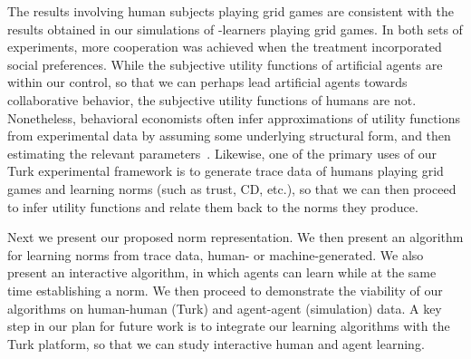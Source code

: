 The results involving human subjects playing grid games are consistent
with the results obtained in our simulations of \Q-learners playing
grid games.  In both sets of experiments, more cooperation was
achieved when the treatment incorporated social preferences.  While
the subjective utility functions of artificial agents are within our
control, so that we can perhaps lead artificial agents towards
collaborative behavior, the subjective utility functions of humans are
not.  Nonetheless, behavioral economists often infer approximations of
utility functions from experimental data by assuming some underlying
structural form, and then estimating the relevant
parameters~\cite{blanco11,fisman07}.  Likewise, one of the primary
uses of our Turk experimental framework is to generate trace data of
humans playing grid games and learning norms (such as trust, CD,
etc.), so that we can then proceed to infer utility functions and
relate them back to the norms they produce.

Next we present our proposed norm representation.  We then present an
algorithm for learning norms from trace data, human- or
machine-generated.  We also present an interactive algorithm, in which
agents can learn while at the same time establishing a norm.  We then
proceed to demonstrate the viability of our algorithms on human-human
(Turk) and agent-agent (simulation) data.  A key step in our plan for
future work is to integrate our learning algorithms with the Turk
platform, so that we can study interactive human and agent learning.

